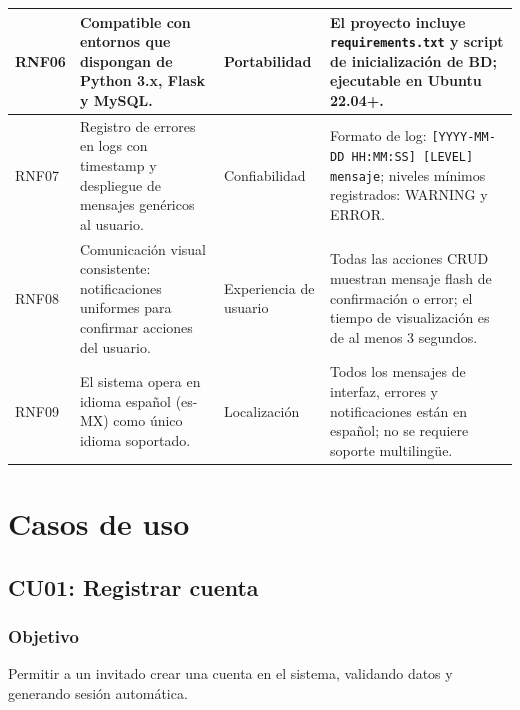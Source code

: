 \documentclass[12pt,a4paper]{article}
\begin{document}
\begin{longtable}{|l|p{7cm}|p{3cm}|p{3.5cm}|}
    RNF06       & Compatible con entornos que dispongan de Python 3.x, Flask y MySQL.                                                   & Portabilidad           &
    El proyecto incluye \texttt{requirements.txt} y script de inicialización de BD; ejecutable en Ubuntu 22.04+.                                                                               \\ \hline

    RNF07       & Registro de errores en logs con timestamp y despliegue de mensajes genéricos al usuario.                              & Confiabilidad          &
    Formato de log: \texttt{[YYYY-MM-DD HH:MM:SS] [LEVEL] mensaje}; niveles mínimos registrados: WARNING y ERROR.                                                                              \\ \hline

    RNF08       & Comunicación visual consistente: notificaciones uniformes para confirmar acciones del usuario.                        & Experiencia de usuario &
    Todas las acciones CRUD muestran mensaje flash de confirmación o error; el tiempo de visualización es de al menos 3 segundos.                                                              \\ \hline

    RNF09       & El sistema opera en idioma español (es-MX) como único idioma soportado.                                               & Localización           &
    Todos los mensajes de interfaz, errores y notificaciones están en español; no se requiere soporte multilingüe.                                                                             \\ \hline
\end{longtable}

\section{Casos de uso}


\subsection{CU01: Registrar cuenta}
\subsubsection*{Objetivo}
Permitir a un invitado crear una cuenta en el sistema, validando datos y generando sesión automática.
\end{document}
